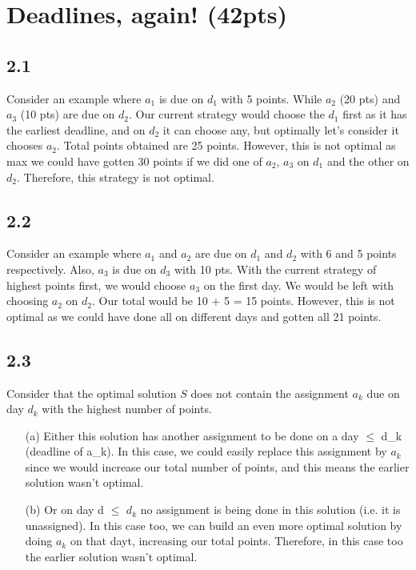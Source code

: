 \documentclass{article}[12pt]
\begin{document}
\section{Deadlines, again! (42pts)}
\subsection*{2.1}
Consider an example where $a_1$ is due on $d_1$ with 5 points. While $a_2$ (20 pts) and $a_3$ (10 pts) are due on $d_2$. Our current strategy would choose the $d_1$ first as it has the earliest deadline, and on $d_2$ it can choose any, but optimally let's consider it chooses $a_2$. Total points obtained are 25 points. However, this is not optimal as max we could have gotten 30 points if we did one of $a_2$, $a_3$ on $d_1$ and the other on $d_2$. Therefore, this strategy is not optimal.

\subsection*{2.2}
Consider an example where $a_1$ and $a_2$ are due on $d_1$ and $d_2$ with 6 and 5 points respectively. Also, $a_3$ is due on $d_3$ with 10 pts. With the current strategy of highest points first, we would choose $a_3$ on the first day. We would be left with choosing $a_2$ on $d_2$. Our total would be 10 + 5 = 15 points. However, this is not optimal as we could have done all on different days and gotten all 21 points.

\subsection*{2.3}
Consider that the optimal solution $S$ does not contain the assignment $a_k$ due on day $d_k$ with the highest number of points.  

\begin{enumerate}
    \item[(a)] Either this solution has another assignment to be done on a day $\le$ d_k (deadline of a_k). In this case, we could easily replace this assignment by $a_k$ since we would increase our total number of points, and this means the earlier solution wasn't optimal.
    
    \item[(b)] Or on day d $\le$ $d_k$ no assignment is being done in this solution (i.e. it is unassigned). In this case too, we can build an even more optimal solution by doing $a_k$ on that dayt, increasing our total points. Therefore, in this case too the earlier solution wasn't optimal.
\end{enumerate}
\end{document}
